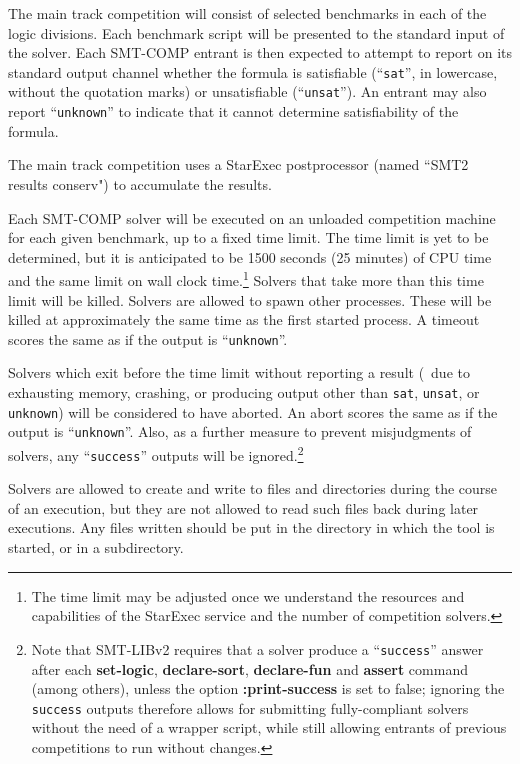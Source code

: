 \documentclass[12pt]{article}
\newcommand{\akey}[1]{\textbf{#1}}
\begin{document}
The main track competition will consist of selected benchmarks in each of the
logic divisions.
Each benchmark script will be presented to the standard input of the solver.
Each SMT-COMP entrant is then expected to attempt to report on its
standard output channel whether the formula is satisfiable
(``\texttt{sat}'', in lowercase, without the quotation marks) or unsatisfiable
(``\texttt{unsat}'').  An entrant may also report ``\texttt{unknown}''
to indicate that it cannot determine satisfiability of the formula.

The main track competition uses a StarExec postprocessor (named ``SMT2 results conserv") to accumulate the results.

Each SMT-COMP solver will be executed on an
unloaded competition machine for each given benchmark, up to a fixed
time limit.  The time limit is yet to be determined, but it is
anticipated to be 1500 seconds (25 minutes) of CPU time and the same limit on wall clock time.\footnote{The time limit may be adjusted once we understand the resources and capabilities of the StarExec service and the number of competition solvers.} 
Solvers that take more than this
time limit will be killed.  Solvers are allowed to spawn other
processes.  These will be killed at approximately the same time as the
first started process.  A
timeout scores the same as if the output is ``\texttt{unknown}''.


Solvers which exit before the time
limit without reporting a result (\ie\ due to exhausting memory, crashing,
or producing output other than \texttt{sat}, \texttt{unsat}, or
\texttt{unknown})
will be considered to have aborted. 
An abort scores the same as if the output is ``\texttt{unknown}''. 
Also, as a further measure to prevent misjudgments of solvers,
any  ``\texttt{success}'' outputs will be 
ignored.\footnote{
Note that SMT-LIBv2 requires that a solver produce a ``\texttt{success}'' answer
after each \akey{set-logic}, \akey{declare-sort}, \akey{declare-fun} and
\akey{assert} command (among others), unless the option
\akey{:print-success} is set to false; ignoring the
\texttt{success} outputs therefore allows for submitting fully-compliant
solvers without the need of a wrapper script, while still allowing entrants
of previous competitions to run without changes.}

Solvers are allowed to create and write to
files and directories during the course of an execution, but they are
not allowed to read such files back during later executions.  Any
files written should be put in the directory in which the tool is
started, or in a subdirectory.
\end{document}
